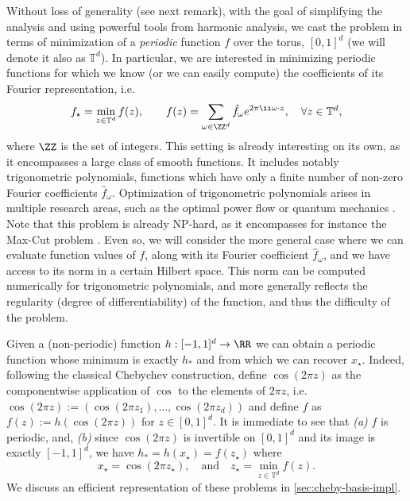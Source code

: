 \documentclass{article}
\begin{document}
Without loss of generality (see next remark), with the goal of simplifying the analysis and using powerful tools from harmonic analysis, we cast the problem in terms of minimization of a \emph{periodic} function $f$ over the torus, $[0,1]^d$ (we will denote it also as $\mathbb{T}^d$). In particular, we are interested in minimizing periodic functions for which we know (or we can easily compute) the coefficients of its Fourier representation, i.e.
\begin{equation}\label{eq:min-probl-main}
  f_\star = \min_{z \in \mathbb{T}^d} f(z), \qquad f(z) = \sum_{\omega \in \ZZ^d} \hat{f}_\omega e^{2\pi \ii \omega \cdot z}, \quad \forall z \in \mathbb{T}^d,
\end{equation}
where $\ZZ$ is the set of integers.
This setting is already interesting on its own, as it encompasses a large class of smooth functions. It includes notably trigonometric polynomials, \ie functions which have only a finite number of non-zero Fourier coefficients $\hat{f}_\omega$. Optimization of trigonometric polynomials arises in multiple research areas, such as the optimal power flow \cite{vanhentenryckMachineLearningOptimal18} or quantum mechanics \cite{hillingGeometricMeasureMultipartite2010}. Note that this problem is already NP-hard, as it encompasses for instance the Max-Cut problem \cite{waldspurgerPhaseRecoveryMaxCut2013}. Even so, we will consider the more general case where we can evaluate function values of $f$, along with its Fourier coefficient $\hat{f}_\omega$, and we have access to its norm in a certain Hilbert space. This norm can be computed numerically for trigonometric polynomials, and more generally reflects the regularity (degree of differentiability) of the function, and thus the difficulty of the problem.

\begin{remark}
  Given a (non-periodic) function $h: [-1,1]^d \to \RR$ we can obtain a periodic function whose minimum is exactly $h_*$ and from which we can recover $x_\star$. Indeed, following the classical Chebychev construction, define $\cos(2\pi z)$ as the componentwise application of $\cos$ to the elements of $2\pi z$, i.e. $\cos(2\pi z) := (\cos(2\pi z_1), \dots, \cos(2\pi z_d))$ and
  define $f$ as $f(z) := h(\cos(2\pi z))$ for $z \in [0,1]^d$. It is immediate to see that \emph{(a)} $f$ is periodic, and, \emph{(b)} since $\cos(2\pi z)$ is invertible on $[0,1]^d$ and its image is exactly $[-1,1]^d$, we have $h_* = h(x_\star) = f(z_\star)$ where
  \begin{equation*}
    x_\star = \cos(2 \pi z_\star), \quad \textrm{and} \quad z_\star = \min_{z \in \mathbb{T}^d} f(z).
  \end{equation*}
  We discuss an efficient representation of these problems in \cref{sec:cheby-basis-impl}.
\end{remark}
\end{document}
